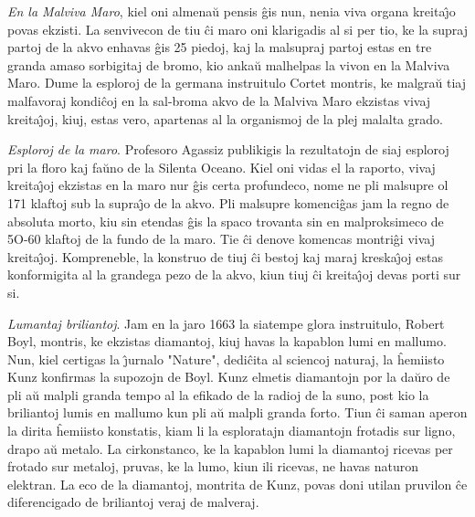\emph{En la Malviva Maro}, kiel oni almena\u u pensis \^gis nun,
nenia viva organa kreita\^{\j}o povas ekzisti. La senvivecon de tiu
\^ci maro oni klarigadis al si per tio, ke la supraj partoj de la
akvo enhavas \^gis
25%
piedoj, kaj la malsupraj partoj estas en tre granda amaso sorbigitaj
de bromo, kio anka\u u malhelpas la vivon en la Malviva Maro. Dume
la esploroj de la germana instruitulo Cortet montris, ke malgra\u u
tiaj malfavoraj kondi\^coj en la sal-broma akvo de la Malviva Maro
ekzistas vivaj kreita\^{\j}oj, kiuj, estas vero, apartenas al la
organismoj de la plej malalta grado.

\emph{Esploroj de la maro}. Profesoro Agassiz publikigis la
rezultatojn de siaj esploroj pri la floro kaj fa\u uno de la Silenta
Oceano. Kiel oni vidas el la raporto, vivaj kreita\^{\j}oj ekzistas
en la maro nur \^gis certa profundeco, nome ne pli malsupre ol 171
klaftoj sub la supra\^{\j}o de la akvo. Pli malsupre komenci\^gas
jam la regno de absoluta morto, kiu sin etendas \^gis la spaco
trovanta sin en malproksimeco de 5O-60 klaftoj de la fundo de la
maro. Tie \^ci denove komencas montri\^gi vivaj kreita\^{\j}oj.
Kompreneble, la konstruo de tiuj \^ci bestoj kaj maraj
kreska\^{\j}oj estas konformigita al la grandega pezo de la akvo,
kiun tiuj \^ci kreita\^{\j}oj devas porti sur si.

\emph{Lumantaj briliantoj}. Jam en la jaro 1663 la siatempe glora
instruitulo, Robert Boyl, montris, ke ekzistas diamantoj, kiuj havas
la kapablon lumi en mallumo. Nun, kiel certigas la \^{\j}urnalo
"Nature", dedi\^cita al sciencoj naturaj, la \^hemiisto Kunz
konfirmas la supozojn de Boyl. Kunz elmetis diamantojn por la da\u
uro de pli a\u u malpli granda tempo al la efikado de la radioj de
la suno, post kio la briliantoj lumis en mallumo kun pli a\u u
malpli granda forto. Tiun \^ci saman aperon la dirita \^hemiisto
konstatis, kiam li la esploratajn diamantojn frotadis sur ligno,
drapo a\u u metalo. La cirkonstanco, ke la kapablon lumi la
diamantoj ricevas per frotado sur metaloj, pruvas, ke la lumo, kiun
ili ricevas, ne havas naturon elektran. La eco de la diamantoj,
montrita de Kunz, povas doni utilan pruvilon \^ce diferencigado de
briliantoj veraj de malveraj.

